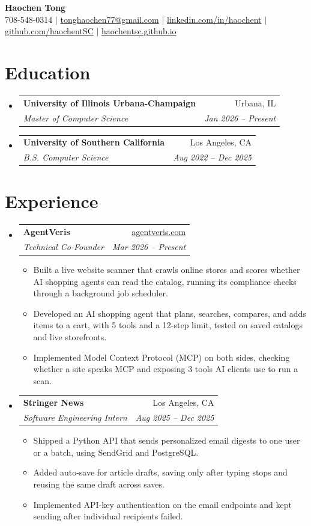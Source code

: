 \documentclass[letterpaper,11pt]{article}
\makeatletter
\newcommand{\resumeItem}[1]{\item\small{#1}}
\newcommand{\resumeSubheading}[4]{
  \item
    \begin{tabular*}{0.97\textwidth}[t]{l@{\extracolsep{\fill}}r}
      \textbf{#1} & #2 \\
      \textit{\small#3} & \textit{\small #4} \\
    \end{tabular*}\vspace{-2pt}
}
\newcommand{\resumeSubHeadingListStart}{%
  \begin{itemize}[leftmargin=0.15in, label={}, topsep=2pt, partopsep=0pt, parsep=0pt, itemsep=4pt]}
\newcommand{\resumeSubHeadingListEnd}{\end{itemize}}
\newcommand{\resumeItemListStart}{%
  \begin{itemize}[leftmargin=0.25in, topsep=2pt, partopsep=0pt, parsep=0pt, itemsep=1pt]}
\newcommand{\resumeItemListEnd}{\end{itemize}\vspace{-3pt}}
\makeatother
\begin{document}
\begin{center}
    \textbf{\Huge Haochen Tong} \\ \vspace{1pt}
    \small 708-548-0314 $|$ \href{mailto:tonghaochen77@gmail.com}{tonghaochen77@gmail.com} $|$ \href{https://linkedin.com/in/haochent}{linkedin.com/in/haochent} $|$ \href{https://github.com/haochentSC}{github.com/haochentSC} $|$ \href{https://haochentsc.github.io}{haochentsc.github.io}
\end{center}

\section{Education}
  \resumeSubHeadingListStart
    \resumeSubheading
      {University of Illinois Urbana-Champaign}{Urbana, IL}
      {Master of Computer Science}{Jan 2026 -- Present}
    \resumeSubheading
      {University of Southern California}{Los Angeles, CA}
      {B.S. Computer Science}{Aug 2022 -- Dec 2025}
  \resumeSubHeadingListEnd

\section{Experience}
  \resumeSubHeadingListStart
\resumeSubheading
  {AgentVeris}{\href{https://www.agentveris.com/}{agentveris.com}}
  {Technical Co-Founder}{Mar 2026 -- Present}
  \resumeItemListStart
    \resumeItem{Built a live website scanner that crawls online stores and scores whether AI shopping agents can read the catalog, running its compliance checks through a background job scheduler.}
    \resumeItem{Developed an AI shopping agent that plans, searches, compares, and adds items to a cart, with 5 tools and a 12-step limit, tested on saved catalogs and live storefronts.}
    \resumeItem{Implemented Model Context Protocol (MCP) on both sides, checking whether a site speaks MCP and exposing 3 tools AI clients use to run a scan.}
  \resumeItemListEnd

\resumeSubheading
  {Stringer News}{Los Angeles, CA}
  {Software Engineering Intern}{Aug 2025 -- Dec 2025}
  \resumeItemListStart
    \resumeItem{Shipped a Python API that sends personalized email digests to one user or a batch, using SendGrid and PostgreSQL.}
    \resumeItem{Added auto-save for article drafts, saving only after typing stops and reusing the same draft across saves.}
    \resumeItem{Implemented API-key authentication on the email endpoints and kept sending after individual recipients failed.}
  \resumeItemListEnd
  \resumeSubHeadingListEnd
\end{document}
